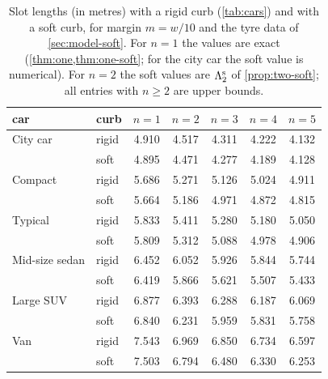 \begin{table}[ht]
\centering\small
\begin{tabular}{@{}llccccc@{}}
\toprule
car & curb & $n=1$ & $n=2$ & $n=3$ & $n=4$ & $n=5$\\
\midrule
City car & rigid & 4.910 & 4.517 & 4.311 & 4.222 & 4.132\\
 & soft & 4.895 & 4.471 & 4.277 & 4.189 & 4.128\\
\addlinespace[2pt]
Compact & rigid & 5.686 & 5.271 & 5.126 & 5.024 & 4.911\\
 & soft & 5.664 & 5.186 & 4.971 & 4.872 & 4.815\\
\addlinespace[2pt]
Typical & rigid & 5.833 & 5.411 & 5.280 & 5.180 & 5.050\\
 & soft & 5.809 & 5.312 & 5.088 & 4.978 & 4.906\\
\addlinespace[2pt]
Mid-size sedan & rigid & 6.452 & 6.052 & 5.926 & 5.844 & 5.744\\
 & soft & 6.419 & 5.866 & 5.621 & 5.507 & 5.433\\
\addlinespace[2pt]
Large SUV & rigid & 6.877 & 6.393 & 6.288 & 6.187 & 6.069\\
 & soft & 6.840 & 6.231 & 5.959 & 5.831 & 5.758\\
\addlinespace[2pt]
Van & rigid & 7.543 & 6.969 & 6.850 & 6.734 & 6.597\\
 & soft & 7.503 & 6.794 & 6.480 & 6.330 & 6.253\\
\bottomrule
\end{tabular}
\caption{Slot lengths (in metres) with a rigid curb (\cref{tab:cars}) and with a soft curb, for margin $m=w/10$ and the tyre data of \cref{sec:model-soft}.
For $n=1$ the values are exact (\cref{thm:one,thm:one-soft}; for the city car the soft value is numerical).
For $n=2$ the soft values are $\Lambda_2^{\rm s}$ of \cref{prop:two-soft}; all entries with $n\ge2$ are upper bounds.}
\label{tab:compare}
\end{table}

